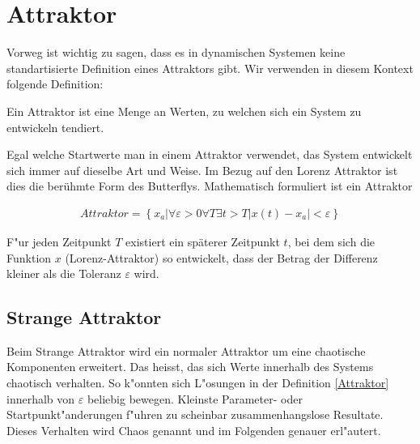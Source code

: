 
\section{Attraktor}
Vorweg ist wichtig zu sagen, dass es in dynamischen Systemen keine standartisierte Definition eines Attraktors gibt. Wir verwenden in diesem Kontext folgende Definition: 
\begin{center}
	Ein Attraktor ist eine Menge an Werten, zu welchen sich ein System zu entwickeln tendiert.
\end{center} Egal welche Startwerte man in einem Attraktor verwendet, das System entwickelt sich immer auf dieselbe Art und Weise. Im Bezug auf den Lorenz Attraktor ist dies die berühmte Form des Butterflys. Mathematisch formuliert ist ein Attraktor 

\begin{align}
\label{Attraktor}Attraktor = \left\{ x_a | \forall \varepsilon > 0
\forall T \exists t > T
|x(t) - x_a| < \varepsilon \right\} 
\end{align}

F"ur jeden Zeitpunkt $T$ existiert ein späterer Zeitpunkt $t$, bei dem sich die Funktion $x$ (Lorenz-Attraktor) so entwickelt, dass der Betrag der Differenz kleiner als die Toleranz $\varepsilon$ wird.

\subsection{Strange Attraktor}
Beim Strange Attraktor wird ein normaler Attraktor um eine chaotische Komponenten erweitert. Das heisst, das sich Werte innerhalb des Systems chaotisch verhalten. So k"onnten sich L"osungen in der Definition \eqref{Attraktor} innerhalb von $\varepsilon$ beliebig bewegen. Kleinste Parameter- oder Startpunkt"anderungen f"uhren zu scheinbar zusammenhangslose Resultate. Dieses Verhalten wird Chaos genannt und im Folgenden genauer erl"autert.
